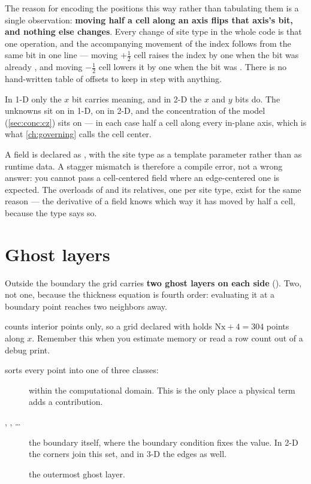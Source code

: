 The reason for encoding the positions this way rather than tabulating them is a
single observation: \textbf{moving half a cell along an axis flips that axis's
bit, and nothing else changes}. Every change of site type in the whole code is
that one operation, and the accompanying movement of the index follows from the
same bit in one line --- moving $+\tfrac12$ cell raises the index by one when
the bit was already , and moving $-\tfrac12$ cell lowers it by one when
the bit was . There is no hand-written table of offsets to keep in step
with anything.

In 1-D only the $x$ bit carries meaning, and in 2-D the $x$ and $y$ bits do.
The unknowns sit on  in 1-D, on  in 2-D, and the
concentration of the  model (\cref{sec:conc:cz}) sits on 
--- in each case half a cell along every in-plane axis, which is what
\cref{ch:governing} calls the cell center.

A field is declared as , with the site type  as a
template parameter rather than as runtime data. A stagger mismatch is therefore
a compile error, not a wrong answer: you cannot pass a cell-centered field where
an edge-centered one is expected. The overloads of
 and its relatives, one per site type, exist
for the same reason --- the derivative of a field knows which way it has moved
by half a cell, because the type says so.

\section{Ghost layers}
\label{sec:disc:ghost}

Outside the boundary the grid carries \textbf{two ghost layers on each side}
(). Two, not one, because the thickness equation is
fourth order: evaluating it at a boundary point reaches two neighbors away.

 counts interior points only, so a grid declared with
 holds $\mathrm{Nx} + 4 = 304$ points along $x$. Remember this
when you estimate memory or read a row count out of a debug print.

 sorts every point into one of three classes:

\begin{description}
  \item[] within the computational domain. This is the only place
    a physical term adds a contribution.
  \item[, , \dots] the boundary itself, where the
    boundary condition fixes the value. In 2-D the corners join this set, and
    in 3-D the edges as well.
  \item[] the outermost ghost layer.
\end{description}

